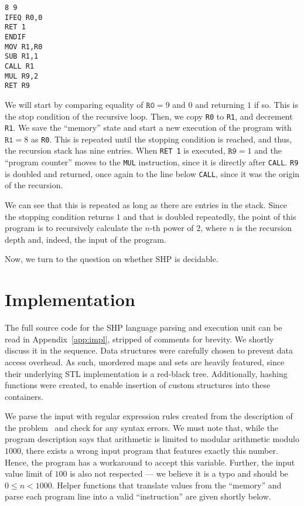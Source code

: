 \documentclass[12pt]{article}
\begin{document}
{\footnotesize
\begin{verbatim}
8 9
IFEQ R0,0
RET 1
ENDIF
MOV R1,R0
SUB R1,1
CALL R1
MUL R9,2
RET R9
\end{verbatim}}

We will start by comparing equality of $\texttt{R0} = 9$ and $0$ and returning $1$ if so. This is the stop condition of the recursive loop. Then, we copy \texttt{R0} to \texttt{R1}, and decrement \texttt{R1}. We save the ``memory'' state and start a new execution of the program with $\texttt{R1} = 8$ as \texttt{R0}. This is repeated until the stopping condition is reached, and thus, the recursion stack has nine entries. When \texttt{RET 1} is executed, $\texttt{R9} = 1$ and the ``program counter'' moves to the \texttt{MUL} instruction, since it is directly after \texttt{CALL}. \texttt{R9} is doubled and returned, once again to the line below \texttt{CALL}, since it was the origin of the recursion. 

We can see that this is repeated as long as there are entries in the stack. Since the stopping condition returns $1$ and that is doubled repeatedly, the point of this program is to recursively calculate the $n$-th power of $2$, where $n$ is the recursion depth and, indeed, the input of the program.

Now, we turn to the question on whether SHP is decidable. 

\section{Implementation}\label{sec:imp}

The full source code for the SHP language parsing and execution unit can be read in Appendix~\ref{app:impl}, stripped of comments for brevity. We shortly discuss it in the sequence. Data structures were carefully chosen to prevent data access overhead. As such, unordered maps and sets are heavily featured, since their underlying STL implementation is a red-black tree. Additionally, hashing functions were created, to enable insertion of custom structures into these containers. 

We parse the input with regular expression rules created from the description of the problem~\cite{Demasi:misc:2013:may} and check for any syntax errors. We must note that, while the program description says that arithmetic is limited to modular arithmetic modulo $1000$, there exists a wrong input program that features exactly this number. Hence, the program has a workaround to accept this variable. Further, the input value limit of $100$ is also not respected --- we believe it is a typo and should be $0 \leq n < 1000$. Helper functions that translate values from the ``memory'' and parse each program line into a valid ``instruction'' are given shortly below.
\end{document}
